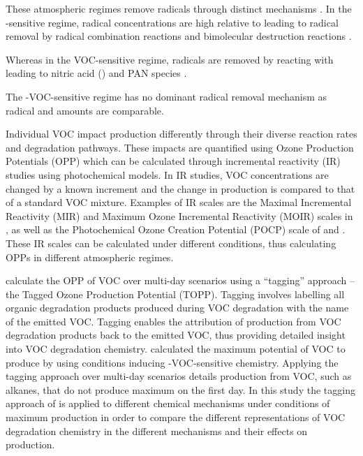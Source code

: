 These atmospheric regimes remove radicals through distinct mechanisms \citep{Kleinman:1991}. 
In the -sensitive regime, radical concentrations are high relative to  leading to radical removal by radical combination reactions  and bimolecular destruction reactions  \citep{Kleinman:1994}.
\vspace{-5mm}
\begin{reactionlist}
\end{reactionlist}
Whereas in the VOC-sensitive regime, radicals are removed by reacting with  leading to nitric acid ()  and PAN species .
\vspace{-3mm}
\begin{reactionlist}
\end{reactionlist}
The -VOC-sensitive regime has no dominant radical removal mechanism as radical and  amounts are comparable.

Individual VOC impact  production differently through their diverse reaction rates and degradation pathways. 
These impacts are quantified using Ozone Production Potentials (OPP) which can be calculated through incremental reactivity (IR) studies using photochemical models. 
In IR studies, VOC concentrations are changed by a known increment and the change in  production is compared to that of a standard VOC mixture. 
Examples of IR scales are the Maximal Incremental Reactivity (MIR) and Maximum Ozone Incremental Reactivity (MOIR) scales in \citet{Carter:1994}, as well as the Photochemical Ozone Creation Potential (POCP) scale of \citet{Derwent:1996} and \citet{Derwent:1998}. 
These IR scales can be calculated under different  conditions, thus calculating OPPs in different atmospheric regimes.

\citet{Butler:2011} calculate the OPP of VOC over multi-day scenarios using a ``tagging'' approach -- the Tagged Ozone Production Potential (TOPP). 
Tagging involves labelling all organic degradation products produced during VOC degradation with the name of the emitted VOC.
Tagging enables the attribution of  production from VOC degradation products back to the emitted VOC, thus providing detailed insight into VOC degradation chemistry.
\citet{Butler:2011} calculated the maximum potential of VOC to produce  by using  conditions inducing -VOC-sensitive chemistry.
Applying the tagging approach over multi-day scenarios details  production from VOC, such as alkanes, that do not produce maximum  on the first day.
In this study the tagging approach of \citet{Butler:2011} is applied to different chemical mechanisms under conditions of maximum  production in order to compare the different representations of VOC degradation chemistry in the different mechanisms and their effects on  production.

